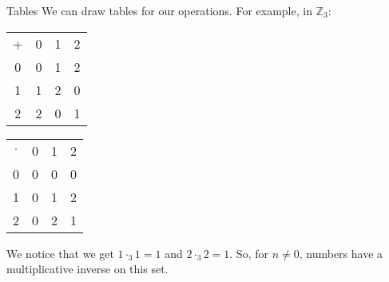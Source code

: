 \documentclass[a4paper]{article}
\begin{document}
\begin{parag}{Tables}
    We can draw tables for our operations. For example, in $\mathbb{Z}_3$: 
    \begin{center}
    \begin{tabular}{c||c|c|c}
        + & 0 & 1 & 2 \\
        \hhline{=#===}
        0 & 0 & 1 & 2 \\
        \hhline{-||---}
        1 & 1 & 2 & 0 \\
        \hhline{-||---}
        2 & 2 & 0 & 1
    \end{tabular}
    \hspace{3em}
    \begin{tabular}{c||c|c|c}
        $\cdot$ & 0 & 1 & 2  \\
        \hhline{=#===}
        0 & 0 & 0 & 0  \\
        \hhline{-||---}
        1 & 0 & 1 & 2  \\
        \hhline{-||---}
        2 & 0 & 2 & 1
    \end{tabular}
    \end{center}
    
    We notice that we get $1\cdot_3 1 = 1$ and $2\cdot_3 2 = 1$. So, for $n \neq 0$, numbers have a multiplicative inverse on this set.
\end{parag}
\end{document}
